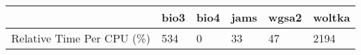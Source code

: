 \begin{tabular}{llllll}
\toprule
{} & bio3 & bio4 & jams & wgsa2 & woltka \\
\midrule
Relative Time Per CPU (\%) &  534 &    0 &   33 &    47 &   2194 \\
\bottomrule
\end{tabular}
